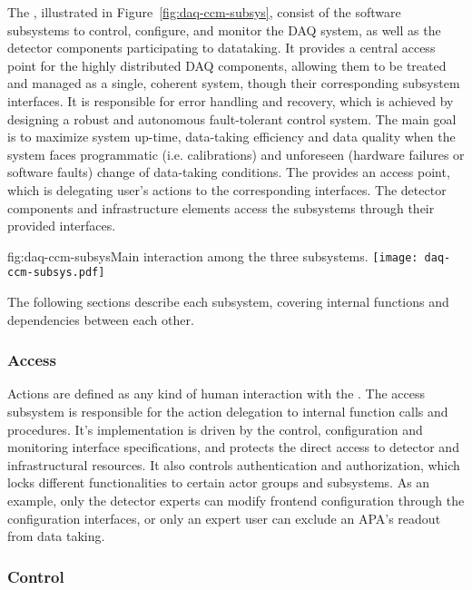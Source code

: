 The , illustrated in Figure~\ref{fig:daq-ccm-subsys}, consist of the software
subsystems to control, configure, and monitor the DAQ system, as well as the detector components
participating to datataking. It provides a central access point for the highly distributed DAQ
components, allowing them to be treated and managed as a single, coherent system, though their
corresponding subsystem interfaces. It is responsible for error handling and recovery, which is
achieved by designing a robust and autonomous fault-tolerant control system. The main goal is to
maximize system up-time, data-taking efficiency and data quality when the system faces programmatic
(i.e. calibrations) and unforeseen (hardware failures or software faults) change of data-taking
conditions. The  provides an access point, which is delegating user’s actions to the
corresponding interfaces. The detector components and infrastructure elements access the 
subsystems through their provided interfaces. 

\begin{dunefigure}{fig:daq-ccm-subsys}{Main interaction among the three  subsystems.}
  \texttt{[image: daq-ccm-subsys.pdf]}
\end{dunefigure}

The following sections describe each  subsystem, covering internal functions and dependencies between each other.

\subsubsection{Access}
\label{sec:daq:design:ccm:access}
Actions are defined as any kind of human interaction with the . The access subsystem is responsible for the action delegation to internal function calls and procedures. It’s implementation is driven by the control, configuration and monitoring interface specifications, and protects the direct access to detector and infrastructural resources. It also controls authentication and authorization, which locks different functionalities to certain actor groups and subsystems. As an example, only the detector experts can modify frontend configuration through the configuration interfaces, or only an expert user can exclude an APA’s readout from data taking. 


\subsubsection{Control}
\label{sec:daq:design:ccm:control}

